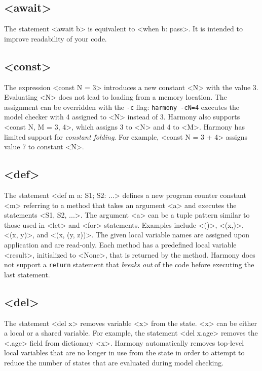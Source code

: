 \documentclass{report}
\begin{document}
\subsection*{<{await}>}

The statement <{await b}> is equivalent to <{when b: pass}>.
It is intended to improve readability of your code.

\subsection*{<{const}>}

The expression <{const N = 3}> introduces a new constant
<{N}> with the value 3.  Evaluating <{N}> does not lead to
loading from a memory location.  The assignment can be overridden with
the \texttt{-c} flag: \texttt{harmony -cN=4} executes the model checker
with 4 assigned to <{N}> instead of 3.
Harmony also supports <{const N, M = 3, 4}>, which
assigns 3 to <{N}> and 4 to <{M}>.
Harmony has limited support for \emph{constant folding}.  For example,
<{const N = 3 + 4}> assigns value 7 to constant <{N}>.

\subsection*{<{def}>}

The statement <{def m a: S1; S2: ...}>
defines a new program counter constant <{m}> referring to
a method that takes an argument <{a}> and executes the statements
<{S1, S2, ...}>.  The argument <{a}> can be a tuple pattern similar
to those used in <{let}> and <{for}> statements.
Examples include <{()}>, <{(x,)}>, <{(x, y)}>, and <{(x, (y, z))}>.
The given local variable names are assigned upon application and
are read-only.
Each method has a predefined local variable
<{result}>, initialized to <{None}>,
that is returned by the method.  Harmony does
not support a \texttt{return} statement that \emph{breaks out}
of the code before executing the last statement.

\subsection*{<{del}>}

The statement <{del x}> removes variable <{x}> from the
state.  <{x}> can be either a local or a shared variable.  For
example, the statement <{del x.age}> removes
the <{.age}> field from dictionary <{x}>.
Harmony automatically removes top-level local variables that
are no longer in use
from the state in order to attempt to reduce the number of states
that are evaluated during model checking.
\end{document}
